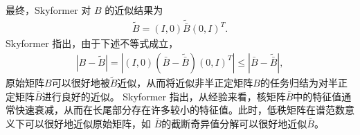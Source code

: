 最终，Skyformer 对 $B$ 的近似结果为
\begin{align}
\label{eqn:approx}
\tilde{B} = (I, 0) \tilde{\bar{B}} (0, I)^T.
\end{align}
Skyformer 指出，由于下述不等式成立，
\begin{align*}
|B - \tilde{B}| = |(I, 0) (\bar{B} - \tilde{\bar{B}}) (0, I)^T| \leq |\bar{B} - \tilde{\bar{B}}|,
\end{align*}
原始矩阵$B$可以很好地被$\tilde{B}$近似，从而将近似非半正定矩阵$B$的任务归结为对半正定矩阵$\bar{B}$进行良好的近似。
Skyformer 指出，从经验来看，核矩阵$\bar{B}$中的特征值通常快速衰减，从而在长尾部分存在许多较小的特征值。此时，低秩矩阵在谱范数意义下可以很好地近似原始矩阵，如 $\bar{B}$的截断奇异值分解可以很好地近似$\bar{B}$。